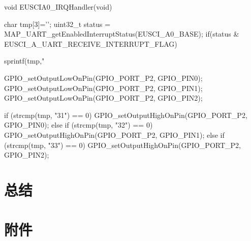 \documentclass[a4paper,10pt,UTF8]{paper}
\numberwithin{equation}{section}
\numberwithin{figure}{section}
\begin{document}
\begin{ccode}
  void EUSCIA0_IRQHandler(void)
  {
    char tmp[3]={'\0'};
    uint32_t status = MAP_UART_getEnabledInterruptStatus(EUSCI_A0_BASE);
    if(status & EUSCI_A_UART_RECEIVE_INTERRUPT_FLAG)
    {          
      sprintf(tmp,"%

      GPIO_setOutputLowOnPin(GPIO_PORT_P2, GPIO_PIN0);
      GPIO_setOutputLowOnPin(GPIO_PORT_P2, GPIO_PIN1);
      GPIO_setOutputLowOnPin(GPIO_PORT_P2, GPIO_PIN2);

      if (strcmp(tmp, "31") == 0) {
        GPIO_setOutputHighOnPin(GPIO_PORT_P2, GPIO_PIN0);
      } else if (strcmp(tmp, "32") == 0) {
        GPIO_setOutputHighOnPin(GPIO_PORT_P2, GPIO_PIN1);
      } else if (strcmp(tmp, "33") == 0) {
        GPIO_setOutputHighOnPin(GPIO_PORT_P2, GPIO_PIN2);
      }
    }   
  }
\end{ccode}

\section{总结}
  
\section{附件}
\end{document}
